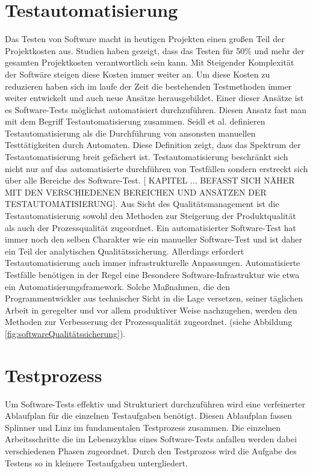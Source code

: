 \section{Testautomatisierung}
\label{sec:testautoGrundlagen}
Das Testen von Software macht in heutigen Projekten einen großen Teil der Projektkosten aus. Studien haben gezeigt, dass das Testen für 50\% 
und mehr der gesamten Projektkosten verantwortlich sein kann. \cite{ramler_economic_2006}
Mit Steigender Komplexität der Softwäre steigen diese Kosten immer weiter an.
Um diese Kosten zu reduzieren haben sich im laufe der Zeit die bestehenden Testmethoden immer weiter entwickelt und auch neue Ansätze herausgebildet. Einer dieser Ansätze ist es Software-Tests möglichst automatisiert durchzuführen. Diesen Ansatz fast man mit dem Begriff Testautomatisierung zusammen.
Seidl et al. definieren Testautomatisierung als \glqq die Durchführung von ansonsten manuellen Testtätigkeiten durch Automaten.\grqq \cite[Seite 7]{seidl_basiswissen_2012}
Diese Definition zeigt, dass das Spektrum der Testautomatisierung breit gefächert ist. Testautomatisierung beschränkt sich nicht nur auf das automatisierte durchführen von Testfällen sondern erstreckt sich über alle Bereiche des Software-Test. [ KAPITEL ... BEFASST SICH NÄHER MIT DEN VERSCHIEDENEN BEREICHEN UND ANSÄTZEN DER TESTAUTOMATISIERUNG].
Aus Sicht des Qualitätsmanagement ist die Testautomatisierung sowohl den Methoden zur Steigerung der Produktqualität als auch der Prozessqualität zugeordnet. Ein automatisierter Software-Test hat immer noch den selben Charakter wie ein manueller Software-Test und ist daher ein Teil der analytischen Qualitätssicherung. Allerdings erfordert Testautomatisierung auch immer infrastrukturelle Anpassungen. Automatisierte Testfälle benötigen in der Regel eine Besondere Software-Infrastruktur wie etwa ein Automatisierungsframework. Solche Maßnahmen, die den Programmentwickler aus technischer Sicht in die Lage versetzen, seiner täglichen Arbeit in geregelter und vor allem produktiver Weise nachzugehen, werden den Methoden zur Verbesserung der Prozessqualität zugeordnet. (siehe Abbildung \ref{fig:softwareQualitätssicherung}).
\cite[vgl. Seite 25]{hoffmann_software-qualitat_2013}


\section{Testprozess}
\label{sec:testprozess}

Um Software-Tests effektiv und Strukturiert durchzuführen wird eine verfeinerter Ablaufplan für die einzelnen Testaufgaben benötigt. Diesen Ablaufplan fassen Splinner und Linz im fundamentalen Testprozess zusammen. Die einzelnen Arbeitsschritte die im Lebenszyklus eines Software-Tests anfallen werden dabei verschiedenen Phasen zugeordnet.
Durch den Testprozess wird die Aufgabe des Testens so in kleinere Testaufgaben untergliedert.

